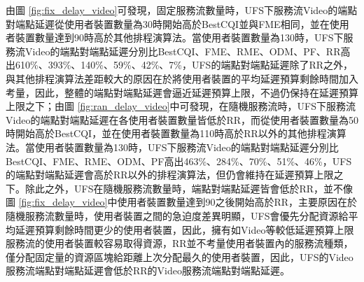 \clearpage
由圖 \ref{fig:fix_delay_video}可發現，固定服務流數量時，UFS下服務流Video的端點對端點延遲從使用者裝置數量為30時開始高於BestCQI並與FME相同，並在使用者裝置數量達到90時高於其他排程演算法。當使用者裝置數量為130時，UFS下服務流Video的端點對端點延遲分別比BestCQI、FME、RME、ODM、PF、RR高出610\%、393\%、140\%、59\%、42\%、7\%，UFS的端點對端點延遲除了RR之外，與其他排程演算法差距較大的原因在於將使用者裝置的平均延遲預算剩餘時間加入考量，因此，整體的端點對端點延遲會逼近延遲預算上限，不過仍保持在延遲預算上限之下；由圖 \ref{fig:ran_delay_video}中可發現，在隨機服務流時，UFS下服務流Video的端點對端點延遲在各使用者裝置數量皆低於RR，而從使用者裝置數量為50時開始高於BestCQI，並在使用者裝置數量為110時高於RR以外的其他排程演算法。當使用者裝置數量為130時，UFS下服務流Video的端點對端點延遲分別比BestCQI、FME、RME、ODM、PF高出463\%、284\%、70\%、51\%、46\%，UFS的端點對端點延遲會高於RR以外的排程演算法，但仍會維持在延遲預算上限之下。除此之外，UFS在隨機服務流數量時，端點對端點延遲皆會低於RR，並不像圖 \ref{fig:fix_delay_video}中使用者裝置數量達到90之後開始高於RR，主要原因在於隨機服務流數量時，使用者裝置之間的急迫度差異明顯，UFS會優先分配資源給平均延遲預算剩餘時間更少的使用者裝置，因此，擁有如Video等較低延遲預算上限服務流的使用者裝置較容易取得資源，RR並不考量使用者裝置內的服務流種類，僅分配固定量的資源區塊給距離上次分配最久的使用者裝置，因此，UFS的Video服務流端點對端點延遲會低於RR的Video服務流端點對端點延遲。
